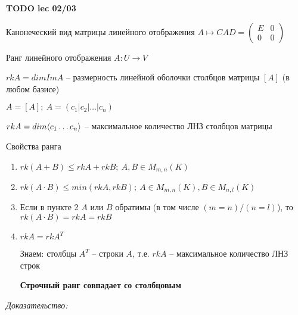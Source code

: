 \documentclass[12pt]{article}
\begin{document}
\textbf{TODO lec 02/03}

\begin{defin}{Канонеческий вид матрицы линейного отображения}
    $A \mapsto CAD = \begin{pmatrix}
        E & 0 \\
        0 & 0
    \end{pmatrix}$
\end{defin}

\begin{defin}{Ранг линейного отображения}
    $A : U \rightarrow V$

    $rkA = dimImA$ -- размерность линейной оболочки столбцов матрицы $[A]$ (в любом базисе)

    $A = [A];\ A = (c_1 | c_2 | \ldots | c_n)$

    $rkA = dim\langle c_1 \ldots c_n \rangle$ -- максимальное количество ЛНЗ столбцов матрицы
\end{defin}

\begin{theo}{Свойства ранга}
    \begin{enumerate}
        \item $rk(A + B) \leq rkA + rkB;\ A, B \in M_{m, n}(K)$
        \item $rk(A \cdot B) \leq min(rkA, rkB);\ A \in M_{m, n}(K), B \in M_{n, l}(K)$
        \item Если в пункте 2 $A$ или $B$ обратимы (в том числе $(m = n)/(n = l)$), то \\ $rk(A \cdot B) = rkA = rkB$
        \item $rkA = rkA^T$
        
        \begin{Remark}{}
            Знаем: столбцы $A^T$ -- строки $A$, т.е. $rkA$ -- максимальное количество ЛНЗ строк

            \textbf{Строчный ранг совпадает со столбцовым}
        \end{Remark}
    \end{enumerate}
\end{theo}

\textit{Доказательство:}
\end{document}
